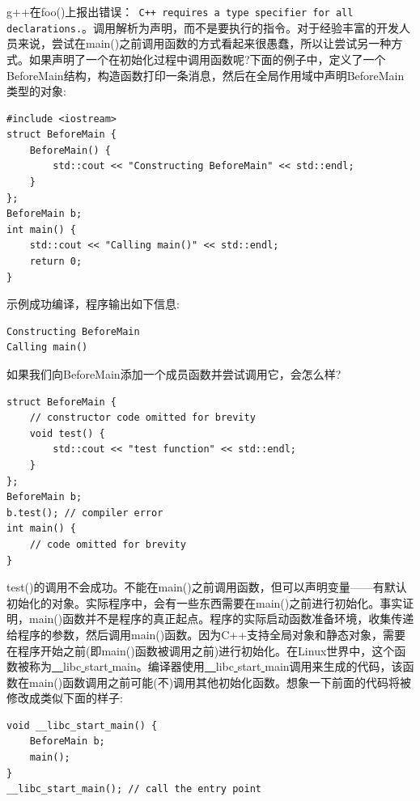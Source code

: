 g++在foo()上报出错误：\texttt{  C++ requires a type specifier for all declarations.}。调用解析为声明，而不是要执行的指令。对于经验丰富的开发人员来说，尝试在main()之前调用函数的方式看起来很愚蠢，所以让尝试另一种方式。如果声明了一个在初始化过程中调用函数呢?下面的例子中，定义了一个BeforeMain结构，构造函数打印一条消息，然后在全局作用域中声明BeforeMain类型的对象: \par

\begin{lstlisting}[caption={}]
#include <iostream>
struct BeforeMain {
	BeforeMain() {
		std::cout << "Constructing BeforeMain" << std::endl;
	}
};
BeforeMain b;
int main() {
	std::cout << "Calling main()" << std::endl;
	return 0;
}
\end{lstlisting}

示例成功编译，程序输出如下信息: \par

\begin{lstlisting}[caption={}]
Constructing BeforeMain
Calling main()
\end{lstlisting}

如果我们向BeforeMain添加一个成员函数并尝试调用它，会怎么样? \par

\begin{lstlisting}[caption={}]
struct BeforeMain {
	// constructor code omitted for brevity
	void test() {
		std::cout << "test function" << std::endl;
	}
};
BeforeMain b;
b.test(); // compiler error
int main() {
	// code omitted for brevity
}
\end{lstlisting}

test()的调用不会成功。不能在main()之前调用函数，但可以声明变量——有默认初始化的对象。实际程序中，会有一些东西需要在main()之前进行初始化。事实证明，main()函数并不是程序的真正起点。程序的实际启动函数准备环境，收集传递给程序的参数，然后调用main()函数。因为C++支持全局对象和静态对象，需要在程序开始之前(即main()函数被调用之前)进行初始化。在Linux世界中，这个函数被称为\underline{~~}libc\underline{ }start\underline{ }main。编译器使用\underline{~~}libc\underline{ }start\underline{ }main调用来生成的代码，该函数在main()函数调用之前可能(不)调用其他初始化函数。想象一下前面的代码将被修改成类似下面的样子: \par

\begin{lstlisting}[caption={}]
void __libc_start_main() {
	BeforeMain b;
	main();
}
__libc_start_main(); // call the entry point
\end{lstlisting}

